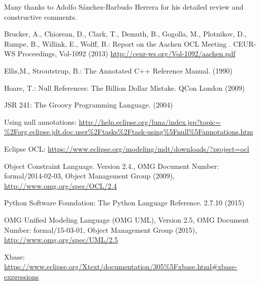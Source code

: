 \documentclass{llncs}
\begin{document}
Many thanks to Adolfo S\'{a}nchez-Barbudo Herrera for his detailed review and constructive comments.

%
%
\begin{thebibliography}{}
%
Brucker, A., Chiorean, D., Clark, T., Demuth, B., Gogolla, M., Plotnikov, D., Rumpe, B., Willink, E., Wolff, B.:
Report on the Aachen OCL Meeting .
CEUR-WS Proceedings, Vol-1092 (2013)
\url{http://ceur-ws.org/Vol-1092/aachen.pdf}

Ellis,M., Stroutstrup, B.:
The Annotated C++ Reference Manual.
(1990)

Hoare, T.:
Null References: The Billion Dollar Mistake.
QCon London (2009)

JSR 241:
The Groovy Programming Language.
(2004)

Using null annotations:
\url{http://help.eclipse.org/luna/index.jsp?topic=
\%2Forg.eclipse.jdt.doc.user\%2Ftasks\%2Ftask-using\%5Fnull\%5Fannotations.htm}

Eclipse OCL:
\url{https://www.eclipse.org/modeling/mdt/downloads/?project=ocl}

 Object Constraint Language. Version 2.4., OMG Document Number: formal/2014-02-03, Object Management Group (2009),  \url{http://www.omg.org/spec/OCL/2.4}

Python Software Foundation:
The Python Language Reference.
2.7.10 (2015)

 OMG Unified Modeling Language (OMG UML), Version 2.5, {OMG Document Number}: formal/15-03-01, Object Management Group (2015), \url{http://www.omg.org/spec/UML/2.5}

Xbase:
\url{https://www.eclipse.org/Xtext/documentation/305\%5Fxbase.html\#xbase-expressions}

\end{thebibliography}
\end{document}
